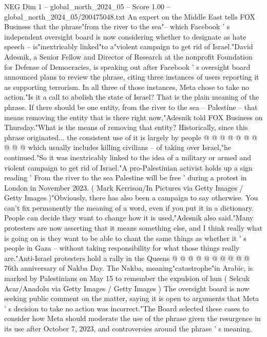 \begin{textsample}{NEG Dim 1 – global\_north\_2024\_05 – Score 1.00 – global\_north\_2024\_05/200475048.txt}  \label{ex:f1_neg_169}
An expert on the Middle East tells FOX Business that the phrase"from the river to the sea"-- which Facebook ' s independent oversight board is now considering whether to designate as hate speech -- is"inextricably linked"to a"violent campaign to get rid of Israel."David Adesnik, a Senior Fellow and Director of Research at the nonprofit Foundation for Defense of Democracies, is speaking out after Facebook ' s oversight board announced plans to review the phrase, citing three instances of users reporting it as supporting terrorism.
In all three of those instances, Meta chose to take no action."Is it a call to abolish the state of Israel?
That is the plain meaning of the phrase.
If there should be one entity, from the river to the sea -- Palestine -- that means removing the entity that is there right now,"Adesnik told FOX Business on Thursday."What is the means of removing that entity?
Historically, since this phrase originated... the consistent use of it is largely by people @ @ @ @ @ @ @ @ @ @ which usually includes killing civilians -- of taking over Israel,"he continued."So it was inextricably linked to the idea of a military or armed and violent campaign to get rid of Israel."A pro-Palestinian activist holds up a sign reading ' From the river to the sea Palestine will be free ' during a protest in London in November 2023. ( Mark Kerrison/In Pictures via Getty Images / Getty Images )"Obviously, there has also been a campaign to say otherwise.
You can't fix permanently the meaning of a word, even if you put it in a dictionary.
People can decide they want to change how it is used,"Adesnik also said."Many protesters are now asserting that it means something else, and I think really what is going on is they want to be able to chant the same things as whether it ' s people in Gaza -- without taking responsibility for what those things really are."Anti-Israel protesters hold a rally in the Queens @ @ @ @ @ @ @ @ @ @ 76th anniversary of Nakba Day.
The Nakba, meaning"catastrophe"in Arabic, is marked by Palestinians on May 15 to remember the expulsion of hun ( Selcuk Acar/Anadolu via Getty Images / Getty Images ) The oversight board is now seeking public comment on the matter, saying it is open to arguments that Meta ' s decision to take no action was incorrect."The Board selected these cases to consider how Meta should moderate the use of the phrase given the resurgence in its use after October 7, 2023, and controversies around the phrase ' s meaning.

\end{textsample}
